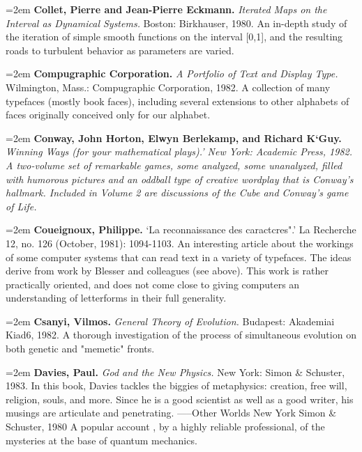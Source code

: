 \par\noindent\hangindent=2em {\bf Collet, Pierre and Jean-Pierre Eckmann.} {\it Iterated Maps on the Interval as Dynamical Systems.} Boston: Birkhauser, 1980. An in-depth study of the iteration of simple smooth functions on the interval [0,1], and the resulting roads to turbulent behavior as parameters are varied.

\par\noindent\hangindent=2em {\bf Compugraphic Corporation.} {\it A Portfolio of Text and Display Type.} Wilmington, Mass.: Compugraphic Corporation, 1982. A collection of many typefaces (mostly book faces), including several extensions to other alphabets of faces originally conceived only for our alphabet.

\par\noindent\hangindent=2em {\bf Conway, John Horton, Elwyn Berlekamp, and Richard K`Guy.} {\it Winning Ways (for your mathematical plays).' New York: Academic Press, 1982. A two-volume set of remarkable games, some analyzed, some unanalyzed, filled with humorous pictures and an oddball type of creative wordplay that is Conway's hallmark. Included in Volume 2 are discussions of the Cube and Conway's game of Life.} 

\par\noindent\hangindent=2em {\bf Coueignoux, Philippe.} `La reconnaissance des caractcres".' La Recherche 12, no. 126 (October, 1981): 1094-1103. An interesting article about the workings of some computer systems that can read text in a variety of typefaces. The ideas derive from work by Blesser and colleagues (see above). This work is rather practically oriented, and does not come close to giving computers an understanding of letterforms in their full generality.

\par\noindent\hangindent=2em {\bf Csanyi, Vilmos.} {\it General Theory of Evolution.} Budapest: Akademiai Kiad6, 1982. A thorough investigation of the process of simultaneous evolution on both genetic and "memetic" fronts.

\par\noindent\hangindent=2em {\bf Davies, Paul.} {\it God and the New Physics.} New York: Simon \& Schuster, 1983. In this book, Davies tackles the biggies of metaphysics: creation, free will, religion, souls, and more. Since he is a good scientist as well as a good writer, his musings are articulate and penetrating. -----Other Worlds New York Simon \& Schuster, 1980 A popular account , by a highly reliable professional, of the mysteries at the base of quantum mechanics.

